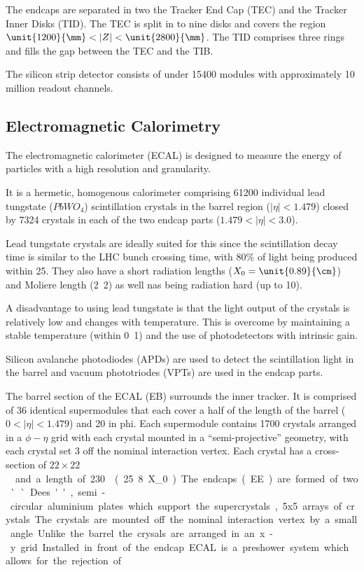 The endcaps are separated in two the Tracker End Cap (TEC) and the Tracker Inner
Disks (TID). The TEC is split in to nine disks and covers the region
$\unit{1200}{\mm} < |Z| < \unit{2800}{\mm}$. The TID comprises three rings
and fills the gap between the TEC and the TIB.

The silicon strip detector consists of under 15400 modules with approximately 10
million readout channels.

\subsection{Electromagnetic Calorimetry}
The electromagnetic calorimeter (ECAL) is 
designed to measure the energy of
particles with a high resolution and granularity.

It is a hermetic, homogenous calorimeter comprising 61200 individual lead
tungstate ($PbWO_{4}$) scintillation crystals in the barrel region
($|\eta|<1.479$) closed by 7324 crystals in each of the two endcap parts
($1.479<|\eta|<3.0$).

Lead tungstate crystals are ideally suited for this since the scintillation
decay time is similar to the LHC bunch crossing time, 
with \unit{80}{\%} of light being produced within \unit{25}{\ns}.
They also have a short radiation lengths ($X_0=\unit{0.89}{\cm}$) 
and Moliere length (\unit{2.2}{\cm}) as well nas being radiation hard
(up to \unit{10}{\mrad}).

A disadvantage to using lead tungstate is that the light output of the crystals
is relatively low and changes with temperature. This is overcome by maintaining
a stable temperature (within \unit{0.1}{\degreecelsius}) and the use of
photodetectors with intrinsic gain.

Silicon avalanche photodiodes (APDs) are used to detect the scintillation light
in the barrel and vacuum phototriodes (VPTs) are used in the endcap parts.

The barrel section of the ECAL (EB) surrounds the inner tracker. It is comprised
of 36 identical supermodules that each cover a half of the length of the barrel
($0<|\eta|<1.479$) and \unit{20}{\degree} in phi. Each supermodule contains
1700 crystals arranged in a $\phi - \eta$ grid with each crystal mounted in a
``semi-projective'' geometry, with each crystal set \unit{3}{\degree} off the
nominal interaction vertex. Each crystal has a cross-section of
\unit{$22 \times 22$}{\mm\squared} and a length of
\unit{230}{\mm}(\unit{25.8}{X_0}).

The endcaps (EE) are formed of two ``Dees'', semi-circular aluminium plates
which support the supercrystals, 5x5 arrays of crystals. The crystals are
mounted off the nominal interaction vertex by a small angle. Unlike the barrel
the crysals are arranged in an x-y grid.
Installed in front of the endcap ECAL is a preshower system which allows for
the rejection of \Ppizero .\cite{cms}

